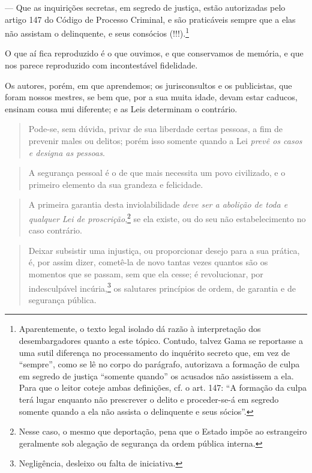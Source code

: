 --- Que as inquirições secretas, em segredo de justiça, estão
  autorizadas pelo artigo 147 do Código de Processo Criminal, e são
  praticáveis sempre que a elas não assistam o delinquente, e seus
  consócios (!!!).\footnote{Aparentemente, o texto legal isolado dá
    razão à interpretação dos desembargadores quanto a este tópico.
    Contudo, talvez Gama se reportasse a uma sutil diferença no
    processamento do inquérito secreto que, em vez de ``sempre'', como
    se lê no corpo do parágrafo, autorizava a formação de culpa em
    segredo de justiça ``somente quando'' os acusados não assistissem a
    ela. Para que o leitor coteje ambas definições, cf. o art. 147: ``A
    formação da culpa terá lugar enquanto não prescrever o delito e
    proceder-se-á em segredo somente quando a ela não assista o
    delinquente e seus sócios''.}

O que aí fica reproduzido é o que ouvimos, e que conservamos de memória,
e que nos parece reproduzido com incontestável fidelidade.

Os autores, porém, em que aprendemos; os jurisconsultos e os
publicistas, que foram nossos mestres, se bem que, por a sua muita
idade, devam estar caducos, ensinam cousa mui diferente; e as Leis
determinam o contrário.

\begin{quote}
Pode-se, sem dúvida, privar de sua liberdade certas pessoas, a fim de
prevenir males ou delitos; porém isso somente quando a Lei \emph{prevê
os casos e designa as pessoas}.
\end{quote}

\begin{quote}
A segurança pessoal é o de que mais necessita um povo civilizado, e o
primeiro elemento da sua grandeza e felicidade.
\end{quote}

\begin{quote}
A primeira garantia desta inviolabilidade \emph{deve ser a abolição
de toda e qualquer Lei de proscrição},\footnote{Nesse caso, o mesmo
que deportação, pena que o Estado impõe ao estrangeiro geralmente
sob alegação de segurança da ordem pública interna.} se ela existe,
ou do seu não estabelecimento no caso contrário.
  \end{quote}

\begin{quote}
Deixar subsistir uma injustiça, ou proporcionar desejo para a sua
prática, é, por assim dizer, cometê-la de novo tantas vezes quantos
são os momentos que se passam, sem que ela cesse; é revolucionar, por
indesculpável incúria,\footnote{Negligência, desleixo ou falta de
iniciativa.} os salutares princípios de ordem, de garantia e de
segurança pública.
\end{quote}

